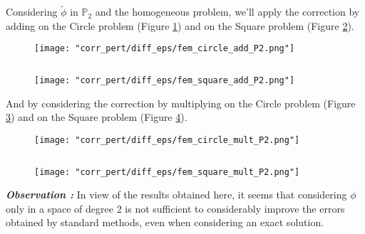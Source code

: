 \begin{Rem}
	Considering $\tilde{\phi}$ in $\mathbb{P}_2$ and the homogeneous problem, we'll apply the correction by adding on the Circle problem (Figure \ref{corr_pert_fem_circle_add_P2}) and on the Square problem (Figure \ref{corr_pert_fem_square_add_P2}).
	
	\begin{minipage}{0.48\linewidth}
		\begin{figure}[H]
			\centering
			\texttt{[image: "corr\_pert/diff\_eps/fem\_circle\_add\_P2.png"]}
			\label{corr_pert_fem_circle_add_P2}
		\end{figure} 
	\end{minipage} $\qquad$
	\begin{minipage}{0.48\linewidth}
		\begin{figure}[H]
			\centering
			\texttt{[image: "corr\_pert/diff\_eps/fem\_square\_add\_P2.png"]}
			\label{corr_pert_fem_square_add_P2}
		\end{figure} 
	\end{minipage}
	
	And by considering the correction by multiplying on the Circle problem (Figure \ref{corr_pert_fem_circle_mult_P2}) and on the Square problem (Figure \ref{corr_pert_fem_square_mult_P2}).
	
	\begin{minipage}{0.48\linewidth}
		\begin{figure}[H]
			\centering
			\texttt{[image: "corr\_pert/diff\_eps/fem\_circle\_mult\_P2.png"]}
			\label{corr_pert_fem_circle_mult_P2}
		\end{figure} 
	\end{minipage} $\qquad$
	\begin{minipage}{0.48\linewidth}
		\begin{figure}[H]
			\centering
			\texttt{[image: "corr\_pert/diff\_eps/fem\_square\_mult\_P2.png"]}
			\label{corr_pert_fem_square_mult_P2}
		\end{figure} 
	\end{minipage}
	\textbf{\textit{Observation :}} In view of the results obtained here, it seems that considering $\phi$ only in a space of degree 2 is not sufficient to considerably improve the errors obtained by standard methods, even when considering an exact solution.
\end{Rem}

